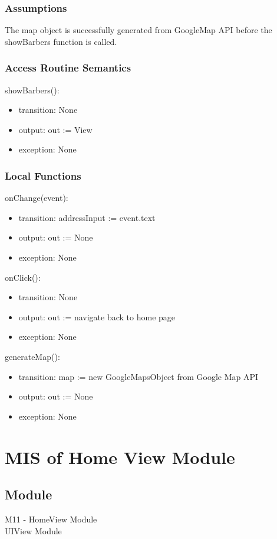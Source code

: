 \documentclass[12pt, titlepage]{article}
\begin{document}
\subsubsection{Assumptions}
The map object is successfully generated from GoogleMap API before the showBarbers function is called.

\subsubsection{Access Routine Semantics}

\noindent showBarbers():
\begin{itemize}
\item transition: None
\item output: out := View 
\item exception: None
\end{itemize}

\subsubsection{Local Functions}
\noindent onChange(event):
\begin{itemize}
\item transition: addressInput := event.text 
\item output: out := None
\item exception: None
\end{itemize}

\noindent onClick():
\begin{itemize}
\item transition: None 
\item output: out := navigate back to home page
\item exception: None
\end{itemize}

\noindent generateMap():
\begin{itemize}
\item transition: map := new GoogleMapsObject from Google Map API 
\item output: out := None
\item exception: None
\end{itemize}

\section{MIS of Home View Module}
\subsection{Module}
M11 - HomeView Module\\
UIView Module
\end{document}
